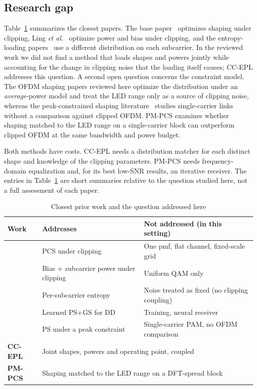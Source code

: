 \documentclass[conference]{IEEEtran}
\begin{document}
\subsection{Research gap}
Table~\ref{tab:gap} summarizes the closest papers. The base paper~\cite{pham2026} optimizes shaping under clipping, Ling \emph{et al.}~\cite{ling2020} optimize power and bias under clipping, and the entropy-loading papers~\cite{ding2020,ma2026,song2024} use a different distribution on each subcarrier. In the reviewed work we did not find a method that loads shapes and powers jointly while accounting for the change in clipping noise that the loading itself causes; CC-EPL addresses this question. A second open question concerns the constraint model. The OFDM shaping papers reviewed here optimize the distribution under an \emph{average}-power model and treat the LED range only as a source of clipping noise, whereas the peak-constrained shaping literature~\cite{wiegart2021,che2021pcs,dytso2020} studies single-carrier links without a comparison against clipped OFDM. PM-PCS examines whether shaping matched to the LED range on a single-carrier block can outperform clipped OFDM at the same bandwidth and power budget.

Both methods have costs. CC-EPL needs a distribution matcher for each distinct shape and knowledge of the clipping parameters. PM-PCS needs frequency-domain equalization and, for its best low-SNR results, an iterative receiver. The entries in Table~\ref{tab:gap} are short summaries relative to the question studied here, not a full assessment of each paper.

\begin{table}[t]\centering\footnotesize
\caption{Closest prior work and the question addressed here}\label{tab:gap}
\begin{tabular}{@{}p{1.25cm}p{2.9cm}p{3.3cm}@{}}\toprule
Work & Addresses & Not addressed (in this setting) \\\midrule
\cite{pham2026} & PCS under clipping & One pmf, flat channel, fixed-scale grid \\
\cite{ling2020} & Bias + subcarrier power under clipping & Uniform QAM only \\
\cite{ding2020,ma2026,song2024} & Per-subcarrier entropy & Noise treated as fixed (no clipping coupling) \\
\cite{fischer2026} & Learned PS+GS for DD & Training, neural receiver \\
\cite{wiegart2021,che2021pcs} & PS under a peak constraint & Single-carrier PAM, no OFDM comparison \\
\textbf{CC-EPL} & \multicolumn{2}{l}{Joint shapes, powers and operating point, coupled} \\
\textbf{PM-PCS} & \multicolumn{2}{l}{Shaping matched to the LED range on a DFT-spread block} \\\bottomrule
\end{tabular}\end{table}
\end{document}
